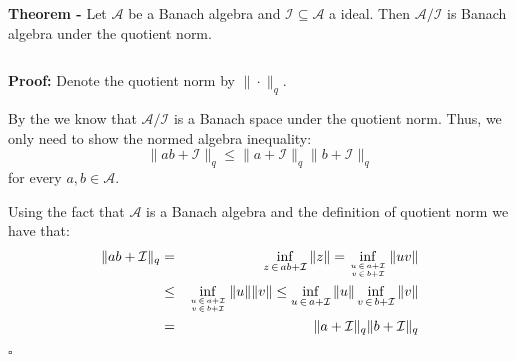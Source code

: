 \documentclass[12pt]{article}
\begin{document}
{\bf Theorem -} Let $\mathcal{A}$ be a Banach algebra and $\mathcal{I} \subseteq \mathcal{A}$ a  ideal. Then $\mathcal{A}/\mathcal{I}$ is Banach algebra under the quotient norm.

$\;$

{\bf Proof:} Denote the quotient norm by $\|\cdot\|_q$.

By the  we know that $\mathcal{A}/\mathcal{I}$ is a Banach space under the quotient norm. Thus, we only need to show the normed algebra inequality:
\begin{displaymath}
\|ab+\mathcal{I}\|_q \leq \|a+\mathcal{I}\|_q \|b+\mathcal{I}\|_q
\end{displaymath}
for every $a, b \in \mathcal{A}$.

Using the fact that $\mathcal{A}$ is a Banach algebra and the definition of quotient norm we have that:
\begin{eqnarray*}
\|ab+\mathcal{I}\|_q & = & \inf_{z \,\in\, ab + \mathcal{I}} \|z\| = \inf_{u \,\in\, a + \mathcal{I}\atop v \,\in\, b + \mathcal{I}} \|uv\| \\
& \leq & \inf_{u \,\in\, a + \mathcal{I}\atop v \,\in\, b + \mathcal{I}} \|u\|\|v\| \leq \inf_{u \,\in\, a + \mathcal{I}}\|u\| \inf_{v \,\in\, b + \mathcal{I}}\|v\| \\
& = & \|a+ \mathcal{I}\|_q \|b+ \mathcal{I}\|_q
\end{eqnarray*}

$\square$
\end{document}
